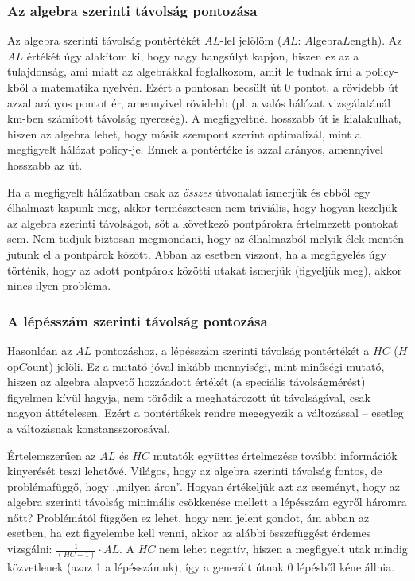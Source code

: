     \subsubsection{Az algebra szerinti távolság pontozása}
    Az algebra szerinti távolság pontértékét $AL$-lel jelölöm ($AL$: $A$lgebra$L$ength). Az $AL$ értékét úgy alakítom ki, hogy nagy hangsúlyt kapjon, hiszen ez az a tulajdonság, ami miatt az algebrákkal foglalkozom, amit le tudnak írni a policy-kből a matematika nyelvén. Ezért a pontosan becsült út 0 pontot, a rövidebb út azzal arányos pontot ér, amennyivel rövidebb (pl. a valós hálózat vizsgálatánál km-ben számított távolság nyereség). A megfigyeltnél hosszabb út is kialakulhat, hiszen az algebra lehet, hogy másik szempont szerint optimalizál, mint a megfigyelt hálózat policy-je. Ennek a pontértéke is azzal arányos, amennyivel hosszabb az út.

    \begin{note}
      Ha a megfigyelt hálózatban csak az \textit{összes} útvonalat ismerjük és ebből egy élhalmazt kapunk meg, akkor természetesen nem triviális, hogy hogyan kezeljük az algebra szerinti távolságot, sőt a következő pontpárokra értelmezett pontokat sem. Nem tudjuk biztosan megmondani, hogy az élhalmazból melyik élek mentén jutunk el a pontpárok között. Abban az esetben viszont, ha a megfigyelés úgy történik, hogy az adott pontpárok közötti utakat ismerjük (figyeljük meg), akkor nincs ilyen probléma.
    \end{note}

    \subsubsection{A lépésszám szerinti távolság pontozása}
    Hasonlóan az $AL$ pontozáshoz, a lépésszám szerinti távolság pontértékét a $HC$ ($H$op$C$ount) jelöli. Ez a mutató jóval inkább mennyiségi, mint minőségi mutató, hiszen az algebra alapvető hozzáadott értékét (a speciális távolságmérést) figyelmen kívül hagyja, nem törődik a meghatározott út távolságával, csak nagyon áttételesen. Ezért a pontértékek rendre megegyezik a változással -- esetleg a változásnak konstansszorosával.

    \begin{note}\label{AL-HC}
      Értelemszerűen az $AL$ és $HC$ mutatók együttes értelmezése további információk kinyerését teszi lehetővé. Világos, hogy az algebra szerinti távolság fontos, de problémafüggő, hogy ,,milyen áron''. Hogyan értékeljük azt az eseményt, hogy az algebra szerinti távolság minimális csökkenése mellett a lépésszám egyről háromra nőtt? Problémától függően ez lehet, hogy nem jelent gondot, ám abban az esetben, ha ezt figyelembe kell venni, akkor az alábbi összefüggést érdemes vizsgálni: $\frac{1}{(HC+1)} \cdot AL$. A $HC$ nem lehet negatív, hiszen a megfigyelt utak mindig közvetlenek (azaz 1 a lépésszámuk), így a generált útnak 0 lépésből kéne állnia.
    \end{note}

